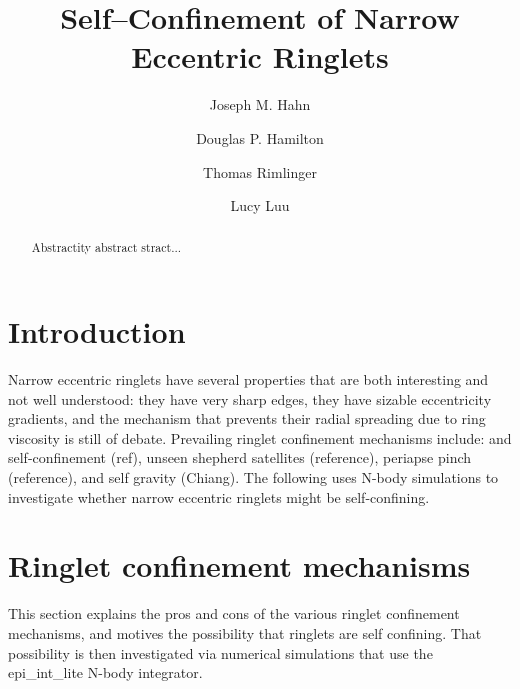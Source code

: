 \documentclass[preprint]{aastex62}
\begin{document}
\title{Self--Confinement of Narrow Eccentric Ringlets}


\author{Joseph M. Hahn}

\author{Douglas P. Hamilton}

\author{Thomas Rimlinger}

\author{Lucy Luu}


\begin{abstract}

Abstractity abstract stract...

\end{abstract}



\section{Introduction} \label{sec:intro}

Narrow eccentric ringlets have several properties that are both interesting and
not well understood: they have very sharp edges,
they have sizable eccentricity gradients, and the mechanism that
prevents their radial spreading due to ring viscosity is still of debate.
Prevailing ringlet confinement mechanisms include: and self-confinement (ref),
unseen shepherd satellites (reference), periapse pinch (reference), and self gravity (Chiang).
The following uses N-body simulations to investigate whether narrow
eccentric ringlets might be self-confining.

\section{Ringlet confinement mechanisms} \label{sec:confinement}

This section explains the pros and cons of the various ringlet confinement mechanisms,
and motives the possibility that ringlets are self confining. That possibility
is then investigated via numerical simulations that use the epi\_int\_lite N-body integrator.
\end{document}
